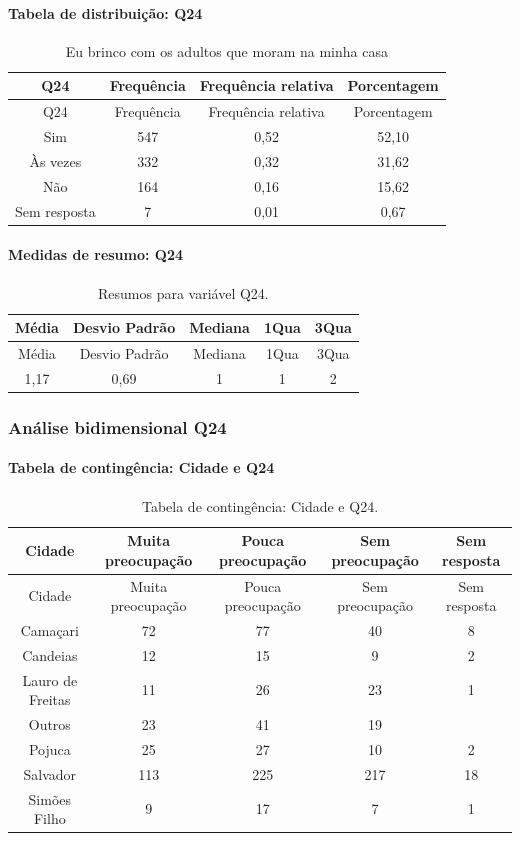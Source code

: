 \documentclass[]{article}
\let\oldparagraph\paragraph
\renewcommand{\paragraph}[1]{\oldparagraph{#1}\mbox{}}
\begin{document}
\hypertarget{tabela-de-distribuiuxe7uxe3o-q24}{%
\paragraph{Tabela de distribuição: Q24}\label{tabela-de-distribuiuxe7uxe3o-q24}}

\begin{longtable}[]{@{}cccc@{}}
\caption{\label{tab:unnamed-chunk-600}Eu brinco com os adultos que moram na minha casa}\tabularnewline
\toprule
Q24 & Frequência & Frequência relativa & Porcentagem\tabularnewline
\midrule
\endfirsthead
\toprule
Q24 & Frequência & Frequência relativa & Porcentagem\tabularnewline
\midrule
\endhead
Sim & 547 & 0,52 & 52,10\tabularnewline
Às vezes & 332 & 0,32 & 31,62\tabularnewline
Não & 164 & 0,16 & 15,62\tabularnewline
Sem resposta & 7 & 0,01 & 0,67\tabularnewline
\bottomrule
\end{longtable}

\hypertarget{medidas-de-resumo-q24}{%
\paragraph{Medidas de resumo: Q24}\label{medidas-de-resumo-q24}}

\begin{longtable}[]{@{}ccccc@{}}
\caption{\label{tab:unnamed-chunk-601}Resumos para variável Q24.}\tabularnewline
\toprule
Média & Desvio Padrão & Mediana & 1Qua & 3Qua\tabularnewline
\midrule
\endfirsthead
\toprule
Média & Desvio Padrão & Mediana & 1Qua & 3Qua\tabularnewline
\midrule
\endhead
1,17 & 0,69 & 1 & 1 & 2\tabularnewline
\bottomrule
\end{longtable}

\cleardoublepage

\hypertarget{anuxe1lise-bidimensional-q24}{%
\subsubsection{Análise bidimensional Q24}\label{anuxe1lise-bidimensional-q24}}

\hypertarget{tabela-de-continguxeancia-cidade-e-q24}{%
\paragraph{Tabela de contingência: Cidade e Q24}\label{tabela-de-continguxeancia-cidade-e-q24}}

\begin{longtable}[]{@{}ccccc@{}}
\caption{\label{tab:unnamed-chunk-602}Tabela de contingência: Cidade e Q24.}\tabularnewline
\toprule
Cidade & Muita preocupação & Pouca preocupação & Sem preocupação & Sem resposta\tabularnewline
\midrule
\endfirsthead
\toprule
Cidade & Muita preocupação & Pouca preocupação & Sem preocupação & Sem resposta\tabularnewline
\midrule
\endhead
Camaçari & 72 & 77 & 40 & 8\tabularnewline
Candeias & 12 & 15 & 9 & 2\tabularnewline
Lauro de Freitas & 11 & 26 & 23 & 1\tabularnewline
Outros & 23 & 41 & 19 &\tabularnewline
Pojuca & 25 & 27 & 10 & 2\tabularnewline
Salvador & 113 & 225 & 217 & 18\tabularnewline
Simões Filho & 9 & 17 & 7 & 1\tabularnewline
\bottomrule
\end{longtable}
\end{document}
